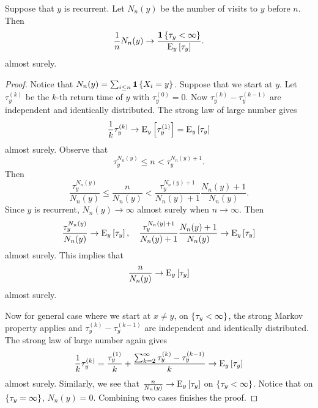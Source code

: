 \begin{theorem}\label{thm:visit_conv}
    Suppose that $y$ is recurrent. Let $N_n(y)$ be the number of visits to 
    $y$ before $n$. Then 
    \begin{equation*}
        \frac{1}{n}N_n(y)\to \frac{\mathbf{1}\left\{ {\tau_y<\infty} \right\}}{\operatorname{E}_y\left[ {\tau_y} \right]}.
    \end{equation*}
    almost surely. 
\end{theorem}
\begin{proof}
    Notice that $N_n(y) = \sum_{i\leq n}\mathbf{1}\left\{ {X_i = y} \right\}$. Suppose that 
    we start at $y$. Let $\tau_y^{(k)}$ be the $k$-th return time of $y$ with 
    $\tau_y^{(0)} = 0$. Now $\tau_y^{(k)}-\tau_y^{(k-1)}$ are independent and 
    identically distributed. The strong law of large number gives 
    \begin{equation*}
        \frac{1}{k}\tau_y^{(k)}\to \operatorname{E}_y\left[ {\tau_y^{(1)}} \right] = \operatorname{E}_y\left[ {\tau_y} \right]
    \end{equation*}
    almost surely. Observe that 
    \begin{equation*}
        \tau_y^{N_n(y)} \leq n < \tau_y^{N_n(y)+1}. 
    \end{equation*}
    Then 
    \begin{equation*}
        \frac{\tau_y^{N_n(y)}}{N_n(y)}\leq \frac{n}{N_n(y)}< \frac{\tau_y^{N_n(y)+1}}{N_n(y)+1}\frac{N_n(y)+1}{N_n(y)}.
    \end{equation*}
    Since $y$ is recurrent, $N_n(y)\to \infty$ almost surely when $n\to\infty$. 
    Then 
    \begin{equation*}
        \frac{\tau_y^{N_n(y)}}{N_n(y)}\to \operatorname{E}_y\left[ {\tau_y} \right], \quad 
        \frac{\tau_y^{N_n(y)+1}}{N_n(y)+1}\frac{N_n(y)+1}{N_n(y)} \to \operatorname{E}_y\left[ {\tau_y} \right]
    \end{equation*}
    almost surely. This implies that 
    \begin{equation*}
        \frac{n}{N_n(y)}\to \operatorname{E}_y\left[ {\tau_y} \right]
    \end{equation*}
    almost surely. 
    
    Now for general case where we start at $x\neq y$, on 
    $\left\{ {\tau_y<\infty} \right\}$, the strong Markov property applies and 
    $\tau_y^{(k)}-\tau_y^{(k-1)}$ are independent and identically distributed. 
    The strong law of large number again gives 
    \begin{equation*}
        \frac{1}{k}\tau_y^{(k)} = \frac{\tau_y^{(1)}}{k} + \frac{\sum_{k=2}^\infty\tau_y^{(k)}-\tau_y^{(k-1)}}{k}\to \operatorname{E}_y\left[ {\tau_y} \right]
    \end{equation*}
    almost surely. Similarly, we see that $\frac{n}{N_n(y)}\to \operatorname{E}_y\left[ {\tau_y} \right]$ 
    on $\left\{ {\tau_y<\infty} \right\}$. Notice that on $\left\{ {\tau_y=\infty} \right\}$, $N_n(y) = 0$. 
    Combining two cases finishes the proof. 
\end{proof}

